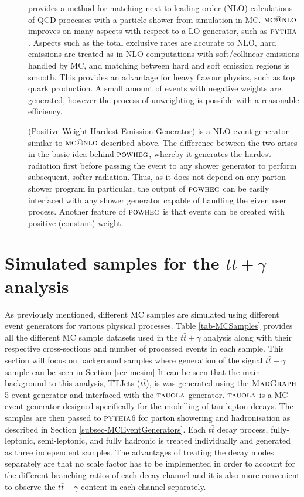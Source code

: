 \begin{description}
	\item[\MCATNLO] \cite{1126-6708-2002-06-029} provides a method for matching next-to-leading order (NLO) calculations of QCD processes with a particle shower from simulation in MC. $\textsc{mc@nlo}$ improves on many aspects with respect to a LO generator, such as ${\textsc{pythia}}$. Aspects such as the total exclusive rates are accurate to NLO, hard emissions are treated as in NLO computations with soft/collinear emissions handled by MC, and matching between hard and soft emission regions is smooth. This provides an advantage for heavy flavour physics, such as top quark production. A small amount of events with negative weights are generated, however the process of unweighting is possible with a reasonable efficiency. 

	\item[\POWHEG] \cite{1126-6708-2007-11-070} (Positive Weight Hardest Emission Generator) is a NLO event generator similar to $\textsc{mc@nlo}$ described above. The difference between the two arises in the basic idea behind ${\textsc{powheg}}$, whereby it generates the hardest radiation first before passing the event to any shower generator to perform subsequent, softer radiation. Thus, as it does not depend on any parton shower program in particular, the output of ${\textsc{powheg}}$ can be easily interfaced with any shower generator capable of handling the given user process. Another feature of ${\textsc{powheg}}$ is that events can be created with positive (constant) weight.  


\end{description}	

\section{Simulated samples for the $t\bar{t}+\gamma$ analysis}

As previously mentioned, different MC samples are simulated using different event generators for various physical processes. Table \ref{tab-MCSamples} provides all the different MC sample datasets used in the $t\bar{t}+\gamma$ analysis along with their respective cross-sections and number of processed events in each sample. This section will focus on background samples where generation of the signal $t\bar{t}+\gamma$ sample can be seen in Section \ref{sec-mcsim} It can be seen that the main background to this analysis, TTJets ($t\bar{t}$), is was generated using the $\textsc{MadGraph}$5 event generator and interfaced with the $\textsc{tauola}$ generator. $\textsc{tauola}$ is a MC event generator designed specifically for the modelling of tau lepton decays. The samples are then passed to ${\textsc{pythia}}$6 for parton showering and hadronisation as described in Section \ref{subsec-MCEventGenerators}. Each $t\bar{t}$ decay process, fully-leptonic, semi-leptonic, and fully hadronic is treated individually and generated as three independent samples. The advantages of treating the decay modes separately are that no scale factor has to be implemented in order to account for the different branching ratios of each decay channel and it is also more convenient to observe the $t\bar{t}+\gamma$ content in each channel separately.

